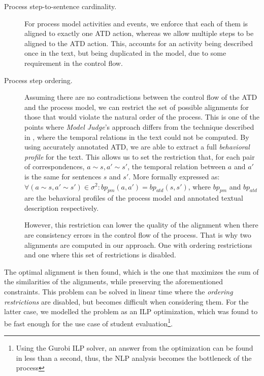 \begin{description}
\item[Process step-to-sentence cardinality.]{
    For process model activities and events, we enforce that each of them is
    aligned to exactly one ATD action, whereas we allow multiple steps to be aligned
    to the ATD action. This, accounts for an activity being described once in
    the text, but being duplicated in the model, due to some requirement in the
    control flow.}
\item[Process step ordering.]{Assuming there are no contradictions between the
    control flow of the ATD and the process model, we can restrict the set of
    possible alignments for those that would violate the natural order of the
    process. This is one of the points where \emph{Model Judge}'s approach
    differs from the technique described in \cite[Section
    5.6]{10.1007/978-3-319-59536-8_26}, where the temporal relations in the text
    could not be computed. By using accurately annotated ATD, we are able to
    extract a full \emph{behavioral profile} for the text. This allows us to set
    the restriction that, for each pair of correspondences, $a \sim s, a' \sim
    s'$, the temporal relation between $a$ and $a'$ is the same for sentences
    $s$ and $s'$. More formally expressed as: $\forall (a \sim s, a' \sim s')
    \in \sigma^2 : bp_{pm}(a, a') = bp_{atd}(s, s')$, where $bp_{pm}$ and
    $bp_{atd}$ are the behavioral profiles of the process model and annotated
    textual description respectively.
    
    However, this restriction can lower the quality of the alignment when there
    are consistency errors in the control flow of the process. That is why two
    alignments are computed in our approach. One with ordering restrictions and
    one where this set of restrictions is disabled.}
\end{description}

The optimal alignment is then found, which is the one that maximizes the sum of
the similarities of the alignments, while preserving the aforementioned
constraints. This problem can be solved in linear time where the \emph{ordering
  restrictions} are disabled, but becomes difficult when considering them. For
the latter case, we modelled the problem as an ILP optimization, which was found
to be fast enough for the use case of student evaluation\footnote{Using the
  Gurobi\cite{gurobi} ILP solver, an answer from the optimization can be found
  in less than a second, thus, the NLP analysis becomes the bottleneck of the
  process}.

